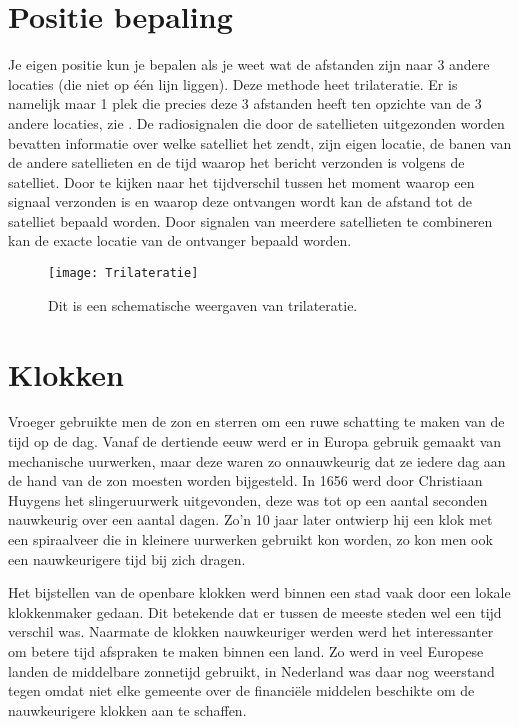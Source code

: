 \section{Positie bepaling}

Je eigen positie kun je bepalen als je weet wat de
afstanden zijn naar 3 andere locaties (die niet op één lijn liggen). Deze methode heet trilateratie. Er is namelijk maar 1 plek die precies deze 3 afstanden heeft ten opzichte van de 3 andere locaties, zie . De radiosignalen die door de
satellieten uitgezonden worden bevatten informatie over welke satelliet
het zendt, zijn eigen locatie, de banen van de andere satellieten en de tijd
waarop het bericht verzonden is volgens de satelliet. Door te kijken
naar het tijdverschil tussen het moment waarop een signaal verzonden is
en waarop deze ontvangen wordt kan de afstand tot de satelliet bepaald
worden. Door signalen van meerdere satellieten te combineren kan de
exacte locatie van de ontvanger bepaald worden.

\begin{figure}
    \centering
    \texttt{[image: Trilateratie]}
    \caption{Dit is een schematische weergaven van trilateratie.}
    \label{fig:Trilateratie}
\end{figure}


\section{Klokken}

Vroeger gebruikte men de zon en sterren om een ruwe schatting te maken
van de tijd op de dag. Vanaf de dertiende eeuw werd er in Europa gebruik
gemaakt van mechanische uurwerken, maar deze waren zo onnauwkeurig dat
ze iedere dag aan de hand van de zon moesten worden bijgesteld. In 1656
werd door Christiaan Huygens het slingeruurwerk uitgevonden, deze was
tot op een aantal seconden nauwkeurig over een aantal dagen. Zo'n 10
jaar later ontwierp hij een klok met een spiraalveer die in kleinere
uurwerken gebruikt kon worden, zo kon men ook een nauwkeurigere tijd bij
zich dragen.

Het bijstellen van de openbare klokken werd binnen een stad vaak door
een lokale klokkenmaker gedaan. Dit betekende dat er tussen de meeste
steden wel een tijd verschil was. Naarmate de klokken nauwkeuriger
werden werd het interessanter om betere tijd afspraken te maken binnen
een land. Zo werd in veel Europese landen de middelbare zonnetijd
gebruikt, in Nederland was daar nog weerstand tegen omdat niet elke
gemeente over de financiële middelen beschikte om de nauwkeurigere
klokken aan te schaffen.

